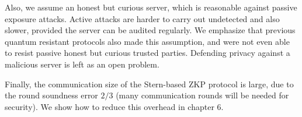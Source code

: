 Also, we assume an honest but curious server, which is reasonable against
passive exposure attacks. Active attacks are harder to carry out undetected and
also slower, provided the server can be audited regularly. We emphasize that
previous quantum resistant protocols also made this assumption, and were not
even able to resist passive honest but curious trusted parties. Defending
privacy against a malicious server is left as an open problem.

Finally, the communication size of the Stern-based ZKP protocol is large, due to
the round soundness error \(2/3\) (many communication rounds will be needed for
security). We show how to reduce this overhead in chapter 6.

